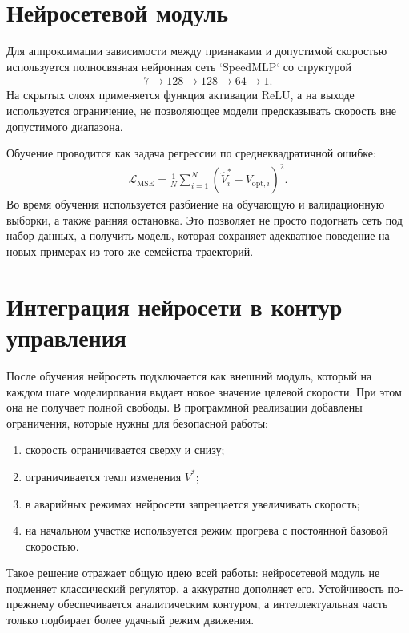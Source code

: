 \section{Нейросетевой модуль}

Для аппроксимации зависимости между признаками и допустимой скоростью используется полносвязная нейронная сеть `SpeedMLP` со структурой
\begin{gather}
    7 \rightarrow 128 \rightarrow 128 \rightarrow 64 \rightarrow 1.
\end{gather}
На скрытых слоях применяется функция активации ReLU, а на выходе используется ограничение, не позволяющее модели предсказывать скорость вне допустимого диапазона.

Обучение проводится как задача регрессии по среднеквадратичной ошибке:
\begin{gather}
    \mathcal{L}_{\mathrm{MSE}} =
    \frac{1}{N}\sum_{i=1}^{N}\left(\hat{V}^{\ast}_i - V_{\mathrm{opt},i}\right)^2.
\end{gather}
Во время обучения используется разбиение на обучающую и валидационную выборки, а также ранняя остановка. Это позволяет не просто подогнать сеть под набор данных, а получить модель, которая сохраняет адекватное поведение на новых примерах из того же семейства траекторий.

\section{Интеграция нейросети в контур управления}

После обучения нейросеть подключается как внешний модуль, который на каждом шаге моделирования выдает новое значение целевой скорости. При этом она не получает полной свободы. В программной реализации добавлены ограничения, которые нужны для безопасной работы:
\begin{enumerate}
    \item скорость ограничивается сверху и снизу;
    \item ограничивается темп изменения $V^{\ast}$;
    \item в аварийных режимах нейросети запрещается увеличивать скорость;
    \item на начальном участке используется режим прогрева с постоянной базовой скоростью.
\end{enumerate}

Такое решение отражает общую идею всей работы: нейросетевой модуль не подменяет классический регулятор, а аккуратно дополняет его. Устойчивость по-прежнему обеспечивается аналитическим контуром, а интеллектуальная часть только подбирает более удачный режим движения.

